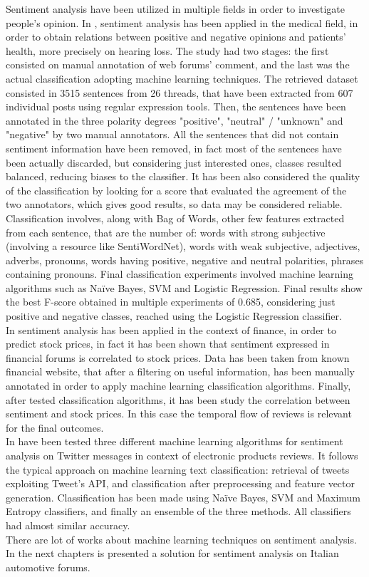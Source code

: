 Sentiment analysis have been utilized in multiple fields in order to investigate people's opinion. In \cite{ali-etal-2013-hear}, sentiment analysis has been applied in the medical field, in order to obtain relations between positive and negative opinions and patients' health, more precisely on hearing loss. The study had two stages: the first consisted on manual annotation of web forums' comment, and the last was the actual classification adopting machine learning techniques. The retrieved dataset consisted in 3515 sentences from 26 threads, that have been extracted from 607 individual posts using regular expression tools. Then, the sentences have been annotated in the three polarity degrees "positive", "neutral" / "unknown" and "negative" by two manual annotators. All the sentences that did not contain sentiment information have been removed, in fact most of the sentences have been actually discarded, but considering just interested ones, classes resulted balanced, reducing biases to the classifier. It has been also considered the quality of the classification by looking for a score that evaluated the agreement of the two annotators, which gives good results, so data may be considered reliable. Classification involves, along with Bag of Words, other few features extracted from each sentence, that are the number of: words with strong subjective (involving a resource like SentiWordNet), words with weak subjective, adjectives, adverbs, pronouns, words having positive, negative and neutral polarities, phrases containing pronouns. Final classification experiments involved machine learning algorithms such as Na{\"i}ve Bayes, \ac{SVM} and Logistic Regression. Final results show the best F-score obtained in multiple experiments of 0.685, considering just positive and negative classes, reached using the Logistic Regression classifier.\\
In \cite{6705664} sentiment analysis has been applied in the context of finance, in order to predict stock prices, in fact it has been shown that sentiment expressed in financial forums is correlated to stock prices. Data has been taken from known financial website, that after a filtering on useful information, has been manually annotated in order to apply machine learning classification algorithms. Finally, after tested classification algorithms, it has been study the correlation between sentiment and stock prices. In this case the temporal flow of reviews is relevant for the final outcomes.\\
In \cite{6726818} have been tested three different machine learning algorithms for sentiment analysis on Twitter messages in context of electronic products reviews. It follows the typical approach on machine learning text classification: retrieval of tweets exploiting Tweet's API, and classification after preprocessing and feature vector generation. Classification has been made using Na{\"i}ve Bayes, \ac{SVM} and Maximum Entropy classifiers, and finally an ensemble of the three methods. All classifiers had almost similar accuracy.\\
There are lot of works about machine learning techniques on sentiment analysis. In the next chapters is presented a solution for sentiment analysis on Italian automotive forums.



